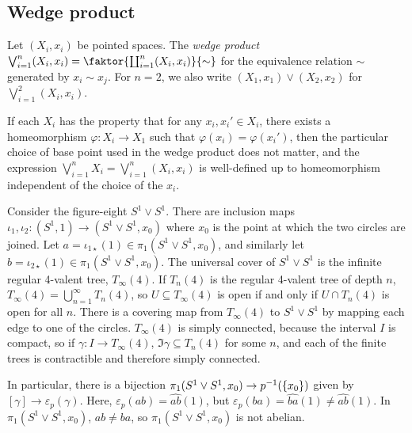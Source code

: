 \subsection{Wedge product}
\begin{definition}
	Let \( (X_i, x_i) \) be pointed spaces.
	The \emph{wedge product} \( \bigvee_{i=1}^n (X_i, x_i) = \faktor{\coprod_{i=1}^n (X_i, x_i)}{\sim} \) for the equivalence relation \( \sim \) generated by \( x_i \sim x_j \).
	For \( n = 2 \), we also write \( (X_1, x_1) \vee (X_2, x_2) \) for \( \bigvee_{i=1}^2 (X_i, x_i) \).
\end{definition}
If each \( X_i \) has the property that for any \( x_i, x_i' \in X_i \), there exists a homeomorphism \( \varphi \colon X_i \to X_1 \) such that \( \varphi(x_i) = \varphi(x_i') \), then the particular choice of base point used in the wedge product does not matter, and the expression \( \bigvee_{i=1}^n X_i = \bigvee_{i=1}^n (X_i, x_i) \) is well-defined up to homeomorphism independent of the choice of the \( x_i \).
\begin{example}
	Consider the figure-eight \( S^1 \vee S^1 \).
	There are inclusion maps \( \iota_1, \iota_2 \colon (S^1,1) \to (S^1 \vee S^1, x_0) \) where \( x_0 \) is the point at which the two circles are joined.
	Let \( a = \iota_{1\star}(1) \in \pi_1(S^1 \vee S^1,x_0) \), and similarly let \( b = \iota_{2\star}(1) \in \pi_1(S^1 \vee S^1,x_0) \).
	The universal cover of \( S^1 \vee S^1 \) is the infinite regular 4-valent tree, \( T_\infty(4) \).
	If \( T_n(4) \) is the regular 4-valent tree of depth \( n \), \( T_\infty(4) = \bigcup_{n=1}^\infty T_n(4) \), so \( U \subseteq T_\infty(4) \) is open if and only if \( U \cap T_n(4) \) is open for all \( n \).
	There is a covering map from \( T_\infty(4) \) to \( S^1 \vee S^1 \) by mapping each edge to one of the circles.
	\( T_\infty(4) \) is simply connected, because the interval \( I \) is compact, so if \( \gamma \colon I \to T_\infty(4) \), \( \Im \gamma \subseteq T_n(4) \) for some \( n \), and each of the finite trees is contractible and therefore simply connected.

	In particular, there is a bijection \( \pi_1(S^1 \vee S^1, x_0) \to p^{-1}(\qty{x_0}) \) given by \( [\gamma] \to \varepsilon_p(\gamma) \).
	Here, \( \varepsilon_p(ab) = \widehat{ab}(1) \), but \( \varepsilon_p(ba) = \widehat{ba}(1) \neq \widehat{ab}(1) \).
	In \( \pi_1(S^1 \vee S^1, x_0) \), \( ab \neq ba \), so \( \pi_1(S^1 \vee S^1,x_0) \) is not abelian.
\end{example}

